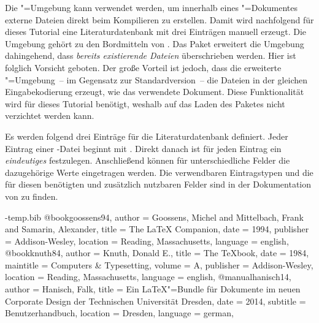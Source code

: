 \documentclass[%
  english,ngerman,%
  geometry=no,DIV=12,automark,%
]{tudscrartcl}
\begin{document}
Die "=Umgebung kann verwendet werden, um innerhalb 
eines "=Dokumentes externe Dateien direkt beim Kompilieren zu
erstellen. Damit wird nachfolgend für dieses Tutorial eine Literaturdatenbank 
 mit drei Einträgen manuell erzeugt. Die Umgebung 
gehört zu den Bordmitteln von . Das Paket  
erweitert die Umgebung dahingehend, dass \emph{bereits existierende Dateien} 
überschrieben werden. Hier ist folglich Vorsicht geboten. Der große Vorteil ist 
jedoch, dass die erweiterte "=Umgebung~-- im 
Gegensatz zur Standardversion~-- die Dateien in der gleichen Eingabekodierung 
erzeugt, wie das verwendete Dokument. Diese Funktionalität wird für dieses 
Tutorial benötigt, weshalb auf das Laden des Paketes  
nicht verzichtet werden kann. 
%
\begin{Preamble}
\usepackage{filecontents}
\end{Preamble}
%
Es werden folgend drei Einträge für die Literaturdatenbank definiert. Jeder 
Eintrag einer -Datei beginnt mit . 
Direkt danach ist für jeden Eintrag ein \emph{eindeutiges}  
festzulegen. Anschließend können für unterschiedliche Felder die dazugehörige 
Werte eingetragen werden. Die verwendbaren Eintragstypen und die für diesen 
benötigten und zusätzlich nutzbaren Felder sind in der Dokumentation von 
 zu finden.
%
\begin{Preamble*}
\begin{filecontents}{\jobname-temp.bib}
@book{goossens94,
  author    = {Goossens, Michel and Mittelbach, Frank
               and Samarin, Alexander},
  title     = {The LaTeX Companion},
  date      = {1994},
  publisher = {Addison-Wesley},
  location  = {Reading, Massachusetts},
  language  = {english},
}
@book{knuth84,
  author    = {Knuth, Donald E.},
  title     = {The \TeX book},
  date      = {1984},
  maintitle = {Computers \& Typesetting},
  volume    = {A},
  publisher = {Addison-Wesley},
  location  = {Reading, Massachusetts},
  language  = {english},
}
@manual{hanisch14,
  author    = {Hanisch, Falk},
  title     = {Ein \LaTeX"=Bundle für Dokumente
               im neuen Corporate Design 
               der Technischen Universität Dresden},
  date      = {2014},
  subtitle  = {Benutzerhandbuch},
  location  = {Dresden},
  language  = {german},
}
\end{filecontents}
\end{Preamble*}
\end{document}

